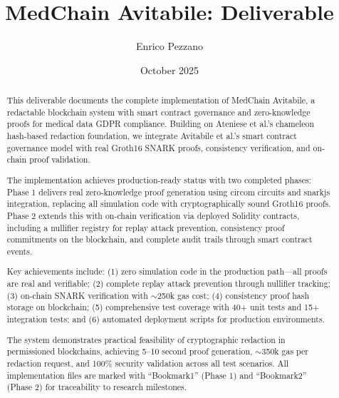\documentclass[11pt,a4paper]{article}
\title{MedChain Avitabile: Deliverable}
\author{Enrico Pezzano}
\date{October 2025}
\begin{document}
\maketitle

\begin{abstract}
This deliverable documents the complete implementation of MedChain Avitabile, a redactable blockchain system with smart contract governance and zero-knowledge proofs for medical data GDPR compliance. Building on Ateniese et al.'s chameleon hash-based redaction foundation, we integrate Avitabile et al.'s smart contract governance model with real Groth16 SNARK proofs, consistency verification, and on-chain proof validation.

The implementation achieves production-ready status with two completed phases: Phase 1 delivers real zero-knowledge proof generation using circom circuits and snarkjs integration, replacing all simulation code with cryptographically sound Groth16 proofs. Phase 2 extends this with on-chain verification via deployed Solidity contracts, including a nullifier registry for replay attack prevention, consistency proof commitments on the blockchain, and complete audit trails through smart contract events.

Key achievements include: (1) zero simulation code in the production path---all proofs are real and verifiable; (2) complete replay attack prevention through nullifier tracking; (3) on-chain SNARK verification with $\sim$250k gas cost; (4) consistency proof hash storage on blockchain; (5) comprehensive test coverage with 40+ unit tests and 15+ integration tests; and (6) automated deployment scripts for production environments.

The system demonstrates practical feasibility of cryptographic redaction in permissioned blockchains, achieving 5--10 second proof generation, $\sim$350k gas per redaction request, and 100\% security validation across all test scenarios. All implementation files are marked with ``Bookmark1'' (Phase 1) and ``Bookmark2'' (Phase 2) for traceability to research milestones.
\end{abstract}

\tableofcontents
\newpage








\nocite{botta2022towards,ateniese2017redactable,avitabile2024data}



\end{document}
